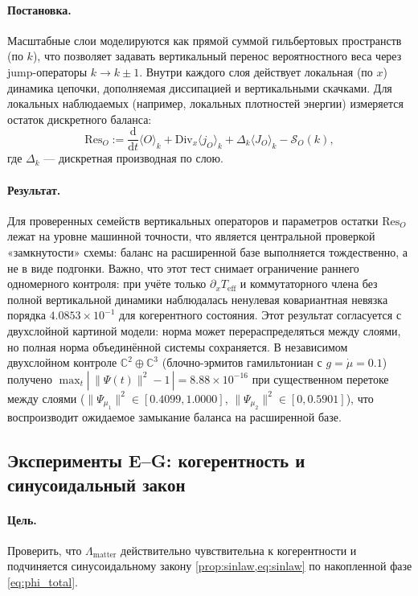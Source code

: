 \documentclass[11pt,a4paper]{article}
\newcommand{\dd}{\mathrm{d}}
\theoremstyle{definition}
\theoremstyle{plain}
\theoremstyle{remark}
\begin{document}
\paragraph{Постановка.}
Масштабные слои моделируются как прямой суммой гильбертовых пространств (по $k$),
что позволяет задавать вертикальный перенос вероятностного веса через jump-операторы $k\to k\pm 1$.
Внутри каждого слоя действует локальная (по $x$) динамика цепочки, дополняемая диссипацией и вертикальными скачками.
Для локальных наблюдаемых (например, локальных плотностей энергии) измеряется остаток дискретного баланса:
\begin{equation}\label{eq:residual_balance}
\mathrm{Res}_O
:=
\frac{\dd}{\dd t}\langle O\rangle_k
+
\mathrm{Div}_x\langle j_O\rangle_k
+
\Delta_k\langle J_O\rangle_k
-
\mathcal S_O(k),
\end{equation}
где $\Delta_k$ — дискретная производная по слою.

\paragraph{Результат.}
Для проверенных семейств вертикальных операторов и параметров остатки $\mathrm{Res}_O$ лежат на уровне машинной точности,
что является центральной проверкой «замкнутости» схемы: баланс на расширенной базе выполняется тождественно,
а не в виде подгонки.
Важно, что этот тест снимает ограничение раннего одномерного контроля:
при учёте только $\partial_x T_{\mathrm{eff}}$ и коммутаторного члена без полной вертикальной динамики
наблюдалась ненулевая ковариантная невязка порядка $4.0853\times10^{-1}$ для когерентного состояния.
Этот результат согласуется с двухслойной картиной модели:
норма может перераспределяться между слоями, но полная норма объединённой системы сохраняется.
В независимом двухслойном контроле $\mathbb C^2\oplus\mathbb C^3$ (блочно-эрмитов гамильтониан с $g=\dot\mu=0.1$)
получено $\max_t|\,\|\Psi(t)\|^2-1\,|=8.88\times10^{-16}$ при существенном перетоке между слоями
($\|\Psi_{\mu_1}\|^2\in[0.4099,1.0000]$, $\|\Psi_{\mu_2}\|^2\in[0,0.5901]$),
что воспроизводит ожидаемое замыкание баланса на расширенной базе.

\subsection{Эксперименты E--G: когерентность и синусоидальный закон}
\label{sec:numerics:EFG}

\paragraph{Цель.}
Проверить, что $\Lambda_{\mathrm{matter}}$ действительно чувствительна к когерентности
и подчиняется синусоидальному закону \cref{prop:sinlaw,eq:sinlaw} по накопленной фазе \cref{eq:phi_total}.
\end{document}
